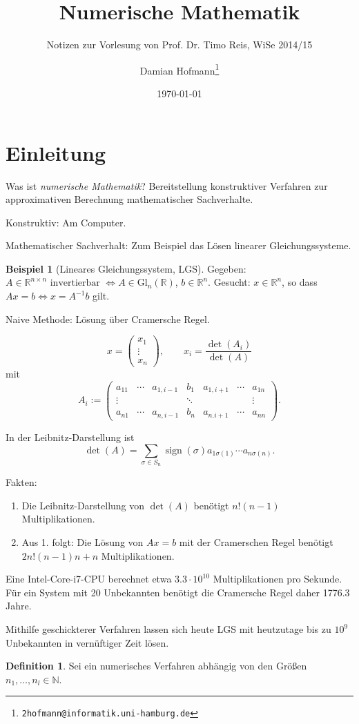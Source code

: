 \documentclass[11pt]{scrartcl}
\title{Numerische Mathematik}
\subtitle{Notizen zur Vorlesung von Prof. Dr. Timo Reis, WiSe 2014/15}
\author{Damian Hofmann\footnote{\texttt{2hofmann@informatik.uni-hamburg.de}}}
\date{\today}
\newcommand*{\NN}{\mathbb N}
\newcommand*{\RR}{\mathbb R}
\newcommand*{\Gl}{\mathrm{Gl}}
\newcommand{\e}[1]{\cdot 10^{#1}}
\DeclareMathOperator*{\sign}{\mathrm{sign}}
\theoremstyle{definition}
\newtheorem{definition}{Definition}
\newtheorem{example}{Beispiel}
\theoremstyle{remark}
\begin{document}
\maketitle

\section{Einleitung}
Was ist \emph{numerische Mathematik}? Bereitstellung konstruktiver Verfahren zur approximativen Berechnung mathematischer Sachverhalte.

Konstruktiv: Am Computer.

Mathematischer Sachverhalt: Zum Beispiel das Lösen linearer Gleichungssysteme.

\begin{example}[Lineares Gleichungssystem, LGS]

Gegeben: $A \in \RR^{n\times n} \text{ invertierbar } \Leftrightarrow A \in \Gl_n(\RR)$,
$b \in \RR^n$.
Gesucht: $x \in \RR^n$, so dass $Ax = b \Leftrightarrow x = A^{-1} b$ gilt.

Naive Methode: Lösung über Cramersche Regel.

$$x = \begin{pmatrix}x_1 \\ \vdots \\ x_n \end{pmatrix}, \qquad x_i = \frac{\det(A_i)}{\det(A)}$$
mit $$A_i :=
\begin{pmatrix}
  a_{11} & \cdots & a_{1,i-1} & b_1 & a_{1,i+1} & \cdots & a_{1n} \\
  \vdots & & & \ddots & & & \vdots \\
  a_{n1} & \cdots & a_{n,i-1} & b_n & a_{n.i+1} & \cdots & a_{nn}
\end{pmatrix}.$$

In der Leibnitz-Darstellung ist $$\det(A) = \sum_{\sigma\in S_n} \sign(\sigma) a_{1\sigma(1)} \cdots a_{n\sigma(n)}.$$

Fakten:
\begin{enumerate}
\item Die Leibnitz-Darstellung von $\det(A)$ benötigt $n! (n-1)$ Multiplikationen.
\item Aus 1. folgt: Die Lösung von $Ax=b$ mit der Cramerschen Regel benötigt $2n!(n-1)n + n$
      Multiplikationen.
\end{enumerate}

Eine Intel-Core-i7-CPU berechnet etwa $3.3\e{10}$ Multiplikationen pro Sekunde.
Für ein System mit 20 Unbekannten benötigt die Cramersche Regel daher 1776.3 Jahre.

Mithilfe geschickterer Verfahren lassen sich heute LGS mit heutzutage bis zu $10^9$
Unbekannten in vernüftiger Zeit lösen.
\end{example}

\begin{definition}
Sei ein numerisches Verfahren abhängig von den Größen $n_1, \ldots, n_l \in \NN$.
\end{definition}
\end{document}
